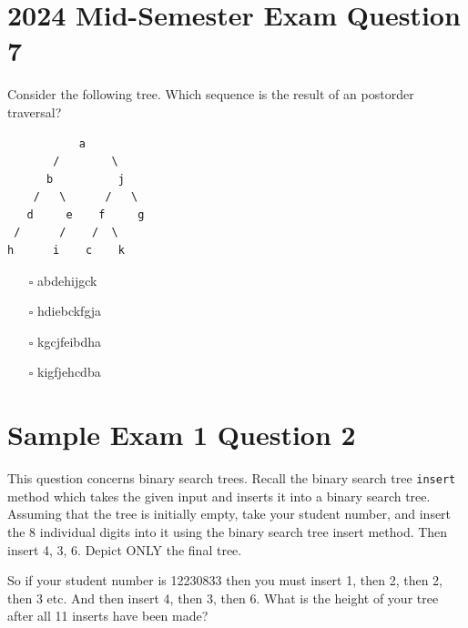 \documentclass[twoside=false,DIV=14]{scrartcl}
\begin{document}
\section{2024 Mid-Semester Exam Question 7}
Consider the following tree. Which sequence is the result of an postorder traversal?           
\begin{verbatim}
           a
       /        \
      b          j
    /   \      /   \
   d     e    f     g
 /      /    /  \
h      i    c    k
\end{verbatim}
\begin{enumerate}
\item[$\square$] abdehijgck
\item[$\square$] hdiebckfgja
\item[$\square$] kgcjfeibdha
\item[$\square$] kigfjehcdba
\end{enumerate}
 

\section{Sample Exam 1 Question 2}
This question concerns binary search trees. Recall the binary search tree \verb+insert+ method which takes the given input and inserts it into a binary search tree. Assuming that the tree is initially empty, take your student number, and insert the 8 individual digits into it using the binary search tree insert method. Then insert 4, 3, 6. Depict ONLY the final tree.

So if your student number is 12230833 then you must insert 1, then 2, then 2, then 3 etc. And then insert 4, then 3, then 6. What is the height of your tree after all 11 inserts have been made?
 
\end{document}
